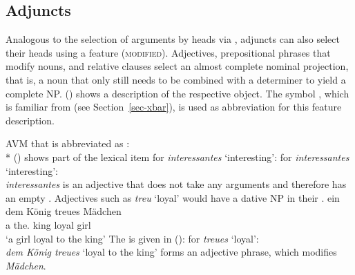 \subsection{Adjuncts}
\label{Abschnitt-HPSG-Adjunkte}\label{sec-adjuncts-hpsg}

Analogous to the selection of arguments by heads via \subcat, adjuncts can also select their heads using a feature (\textsc{modified}).
Adjectives, prepositional phrases that modify nouns, and relative clauses select an almost complete nominal projection, that is, a noun that only still needs to
be combined with a determiner to yield a complete NP. () shows a description of the respective 
object. The symbol \nbar, which is familiar from \xbart (see Section~\ref{sec-xbar}), is used as abbreviation
for this feature description.

\ea
AVM that is abbreviated as \nbar:\\*
\z
() shows part of the lexical item for \emph{interessantes} `interesting':
\eas{}
\label{le-interessantes}
\catv for \emph{interessantes} `interesting':\\
\zs
\emph{interessantes} is an adjective that does not take any arguments and therefore has an empty \subcatl. Adjectives such as \emph{treu} `loyal' would
have a dative NP in their \subcatl.
\ea
\gll ein dem König treues Mädchen\\
	a the.\dat{} king loyal girl\\
\glt `a girl loyal to the king'
\z
The \catv is given in ():
\ea
\label{le-treue}
\catv for \emph{treues} `loyal':\\
\z
\emph{dem König treues} `loyal to the king' forms an adjective phrase, which modifies \emph{Mädchen}.

